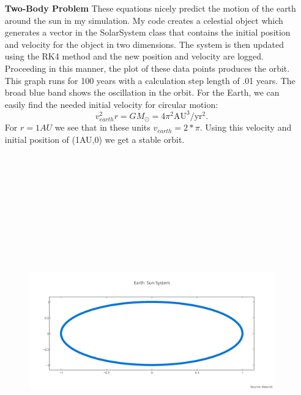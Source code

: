 \documentclass[11pt,a4wide]{article}
\begin{document}
\newpage
\begin{enumerate}
\item[\bf Two-Body Problem]
These equations nicely predict the motion of the earth around the sun in my simulation. My code creates a celestial object which generates a vector in the SolarSystem class that contains the initial position and velocity for the object in two dimensions. The system is then updated using the RK4 method and the new position and velocity are logged. Proceeding in this manner, the plot of these data points produces the orbit. This graph runs for 100 years with a calculation step length of .01 years. The broad blue band shows the oscillation in the orbit.  For the Earth, we can easily find the needed initial velocity for circular motion: 
\[
v_{earth}^2r=GM_{\odot}=4\pi^2\mathrm{AU}^3/\mathrm{yr}^2.
\]\newline
For $r=1AU$ we see that in these units $v_{earth}=2*\pi$. Using this velocity and initial position of (1AU,0) we get a stable orbit. 
\begin{figure}
\centering
\includegraphics[width=6in, height=6in]{earth_sun_system.png}\\
\end{figure}

\end{enumerate}
\end{document}
